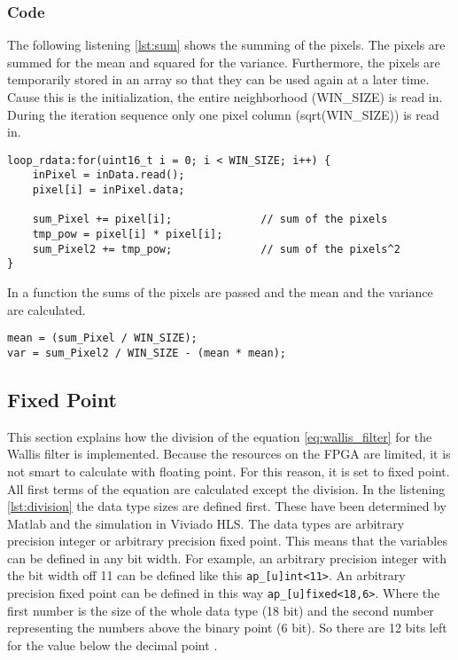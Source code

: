 \subsubsection*{Code}
The following listening \ref{lst:sum} shows the summing of the pixels. The pixels are summed for the mean and squared for the variance. Furthermore, the pixels are temporarily stored in an array so that they can be used again at a later time. \\
Cause this is the initialization, the entire neighborhood (WIN\_SIZE) is read in. During the iteration sequence only one pixel column (sqrt(WIN\_SIZE)) is read in. \\
\begin{minipage}{\textwidth}
\begin{lstlisting}[style=CStyle, caption=Calculation of the sum, label=lst:sum]
loop_rdata:for(uint16_t i = 0; i < WIN_SIZE; i++) {
	inPixel = inData.read();
	pixel[i] = inPixel.data;

	sum_Pixel += pixel[i];				// sum of the pixels
	tmp_pow = pixel[i] * pixel[i];
	sum_Pixel2 += tmp_pow;				// sum of the pixels^2
}
\end{lstlisting}
\end{minipage}

In a function the sums of the pixels are passed and the mean and the variance are calculated. \\
\begin{minipage}{\textwidth}
\begin{lstlisting}[style=CStyle, caption=Calculation of the mean and variance, label=lst:mean_var]
mean = (sum_Pixel / WIN_SIZE);
var = sum_Pixel2 / WIN_SIZE - (mean * mean);
\end{lstlisting}
\end{minipage}


\subsection{Fixed Point}
This section explains how the division of the equation \ref{eq:wallis_filter} for the Wallis filter is implemented. Because the resources on the FPGA are limited, it is not smart to calculate with floating point. For this reason, it is set to fixed point. \\
All first terms of the equation are calculated except the division. In the listening \ref{lst:division} the data type sizes are defined first. These have been determined by Matlab and the simulation in Viviado HLS. 
The data types are arbitrary precision integer or arbitrary precision fixed point. This means that the variables can be defined in any bit width. For example, an arbitrary precision integer with the bit width off 11 can be defined like this \texttt{ap\_[u]int<11>}. An arbitrary precision fixed point can be defined in this way \texttt{ap\_[u]fixed<18,6>}. Where the first number is the size of the whole data type (18 bit) and the second number representing the numbers above the binary point (6 bit). So there are 12 bits left for the value below the decimal point \cite{ug902}. \\   

